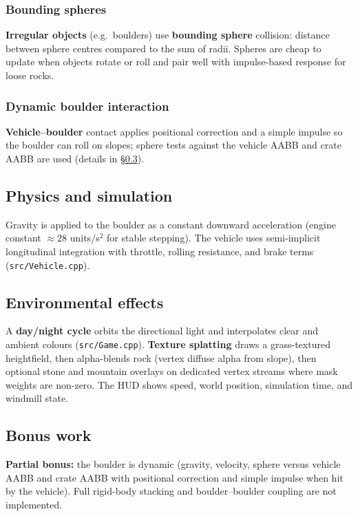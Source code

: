 \documentclass[11pt,a4paper]{article}
\begin{document}
\subsubsection{Bounding spheres}
\textbf{Irregular objects} (e.g.\ boulders) use \textbf{bounding sphere} collision: distance between sphere centres compared to the sum of radii. Spheres are cheap to update when objects rotate or roll and pair well with impulse-based response for loose rocks.

\subsubsection{Dynamic boulder interaction}
\textbf{Vehicle--boulder} contact applies positional correction and a simple impulse so the boulder can roll on slopes; sphere tests against the vehicle AABB and crate AABB are used (details in \S\ref{sec:bonus}).

\subsection{Physics and simulation}
\label{sec:techniques-physics}
Gravity is applied to the boulder as a constant downward acceleration (engine constant $\approx 28$ units/s$^2$ for stable stepping). The vehicle uses semi-implicit longitudinal integration with throttle, rolling resistance, and brake terms (\texttt{src/Vehicle.cpp}).

\subsection{Environmental effects}
A \textbf{day/night cycle} orbits the directional light and interpolates clear and ambient colours (\texttt{src/Game.cpp}). \textbf{Texture splatting} draws a grass-textured heightfield, then alpha-blends rock (vertex diffuse alpha from slope), then optional stone and mountain overlays on dedicated vertex streams where mask weights are non-zero. The HUD shows speed, world position, simulation time, and windmill state.

\subsection{Bonus work}
\label{sec:bonus}
\textbf{Partial bonus:} the boulder is dynamic (gravity, velocity, sphere versus vehicle AABB and crate AABB with positional correction and simple impulse when hit by the vehicle). Full rigid-body stacking and boulder--boulder coupling are not implemented.
\end{document}
